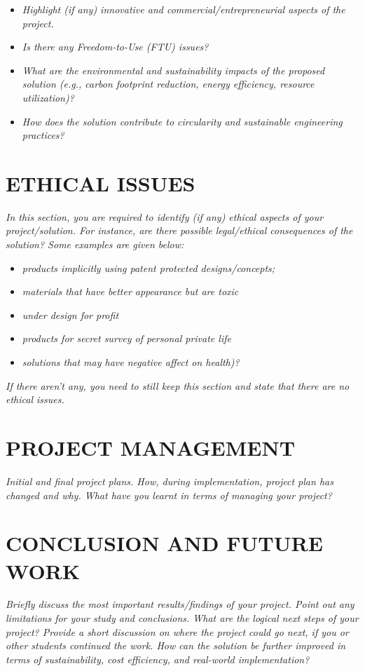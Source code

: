 \documentclass[12pt,letterpaper]{article}
\begin{document}
\begin{itemize}
\item \textit{Highlight (if any) innovative and commercial/entrepreneurial aspects of the project.}
\item \textit{Is there any Freedom-to-Use (FTU) issues?}
\item \textit{What are the environmental and sustainability impacts of the proposed solution (e.g., carbon footprint reduction, energy efficiency, resource utilization)?}
\item \textit{How does the solution contribute to circularity and sustainable engineering practices?}
\end{itemize}

\section{ETHICAL ISSUES}
\textit{In this section, you are required to identify (if any) ethical aspects of your project/solution. For instance, are there possible legal/ethical consequences of the solution? Some examples are given below:}

\begin{itemize}
\item \textit{products implicitly using patent protected designs/concepts;}
\item \textit{materials that have better appearance but are toxic}
\item \textit{under design for profit}
\item \textit{products for secret survey of personal private life}
\item \textit{solutions that may have negative affect on health)?}
\end{itemize}

\textit{If there aren't any, you need to still keep this section and state that there are no ethical issues.}

\section{PROJECT MANAGEMENT}
\textit{Initial and final project plans. How, during implementation, project plan has changed and why. What have you learnt in terms of managing your project?}

\section{CONCLUSION AND FUTURE WORK}
\textit{Briefly discuss the most important results/findings of your project. Point out any limitations for your study and conclusions. What are the logical next steps of your project? Provide a short discussion on where the project could go next, if you or other students continued the work. How can the solution be further improved in terms of sustainability, cost efficiency, and real-world implementation?}
\end{document}
